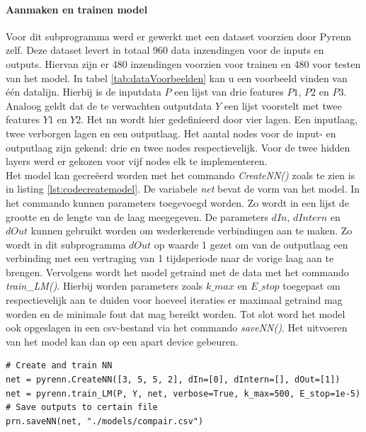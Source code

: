 	
			\paragraph{Aanmaken en trainen model}
			Voor dit subprogramma werd er gewerkt met een dataset voorzien door Pyrenn zelf. Deze dataset levert in totaal 960 data inzendingen voor de inputs en outputs. Hiervan zijn er 480 inzendingen voorzien voor trainen en 480 voor testen van het model. In tabel \ref{tab:dataVoorbeelden} kan u een voorbeeld vinden van \'e\'en datalijn. Hierbij is de inputdata $P$ een lijst van drie features $P1$, $P2$ en $P3$. Analoog geldt dat de te verwachten outputdata $Y$ een lijst voorstelt met twee features $Y1$ en $Y2$. Het \gls{nn} wordt hier gedefinieerd door vier lagen. Een inputlaag, twee verborgen lagen en een outputlaag. Het aantal nodes voor de input- en outputlaag zijn gekend: drie en twee nodes respectievelijk. Voor de twee hidden layers werd er gekozen voor vijf nodes elk te implementeren.\\
			Het model kan gecre\"eerd worden met het commando \textit{CreateNN()} zoals te zien is in listing \ref{lst:codecreatemodel}. De variabele \textit{net} bevat de vorm van het model. In het commando kunnen parameters toegevoegd worden. Zo wordt in een lijst de grootte en de lengte van de laag meegegeven. De parameters $dIn$, $dIntern$ en $dOut$ kunnen gebruikt worden om wederkerende verbindingen aan te maken. Zo wordt in dit subprogramma $dOut$ op waarde 1 gezet om van de outputlaag een verbinding met een vertraging van 1 tijdsperiode naar de vorige laag aan te brengen. Vervolgens wordt het model getraind met de data met het commando \textit{train\_LM()}. Hierbij worden parameters zoals $k\_max$ en $E\_stop$ toegepast om respectievelijk aan te duiden voor hoeveel iteraties er maximaal getraind mag worden en de minimale fout dat mag bereikt worden. Tot slot word het model ook opgeslagen in een \gls{csv}-bestand via het commando \textit{saveNN()}. Het uitvoeren van het model kan dan op een apart device gebeuren. 

			\begin{lstlisting}[caption={Cre\"eren en trainen van pyrenn-model.},captionpos=b, label = {lst:codecreatemodel}]
# Create and train NN
net = pyrenn.CreateNN([3, 5, 5, 2], dIn=[0], dIntern=[], dOut=[1])
net = pyrenn.train_LM(P, Y, net, verbose=True, k_max=500, E_stop=1e-5)
# Save outputs to certain file
prn.saveNN(net, "./models/compair.csv")
\end{lstlisting}
			
			\newpage


